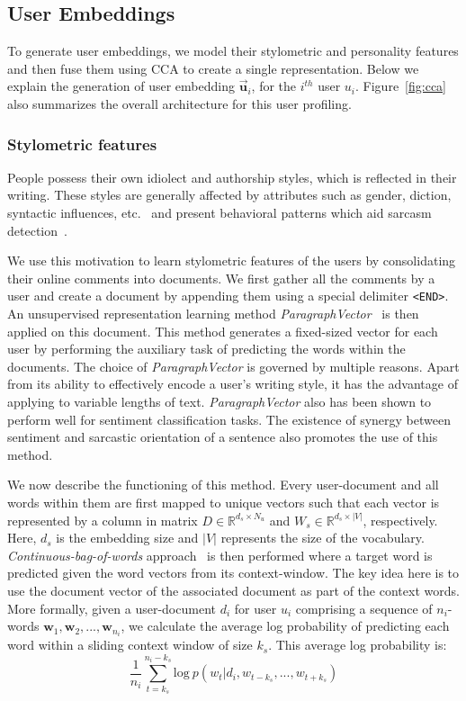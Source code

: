 \documentclass[11pt]{article}
\begin{document}
\subsection{User Embeddings} \label{sec:user}
To generate user embeddings,  we model their stylometric and personality features and then fuse them using CCA to create a single representation. Below we explain the generation of user embedding $\vec{\bm{u}}_{i}$, for the $i^{th}$ user $u_i$. Figure~\ref{fig:cca} also summarizes the overall architecture for this user profiling.

\subsubsection{Stylometric features} \label{sec:stylometric}
People possess their own idiolect and authorship styles, which is reflected in their writing. These styles are generally affected by attributes such as gender, diction, syntactic influences, etc.~\cite{cheng2011author,stamatatos2009survey} and present behavioral patterns which aid sarcasm detection~\cite{rajadesingan2015sarcasm}.  

We use this motivation to learn stylometric features of the users by consolidating their online comments into documents. We first gather all the comments by a user and create a document by appending them using a special delimiter \verb|<END>|. An unsupervised representation learning method \textit{ParagraphVector}~\cite{le2014distributed} is then applied on this document. This method generates a fixed-sized vector for each user by performing the auxiliary task of predicting the words within the documents. The choice of \textit{ParagraphVector} is governed by multiple reasons. Apart from its ability to effectively encode a user's writing style, it has the advantage of applying to variable lengths of text. \textit{ParagraphVector} also has been shown to perform well for sentiment classification tasks. The existence of synergy between sentiment and sarcastic orientation of a sentence also promotes the use of this method.


We now describe the functioning of this method. Every user-document and all words within them are first mapped to unique vectors such that each vector is represented by a column in matrix $D \in \mathbb{R}^{d_{s} \times N_u}$ and $W_s \in \mathbb{R}^{d_{s} \times |V|}$, respectively. Here, $d_s$ is the embedding size and $|V|$ represents the size of the vocabulary. \textit{Continuous-bag-of-words} approach~\cite{mikolov2013distributed} is then performed where a target word is predicted given the word vectors from its context-window. The key idea here is to use the document vector of the associated document as part of the context words. More formally, given a user-document $d_i$ for user $u_i$ comprising a sequence of $n_i$-words $\bm{w}_1, \bm{w}_2, ..., \bm{w}_{n_i}$, we calculate the average log probability of predicting each word within a sliding context window of size $k_s$. This average log probability is:
\begin{equation}
\frac{1}{n_i} \sum_{t=k_s}^{n_i - k_s}\text{log} \ p(w_t | d_{i}, w_{t-k_s},..., w_{t+k_s})
\end{equation}
\end{document}
